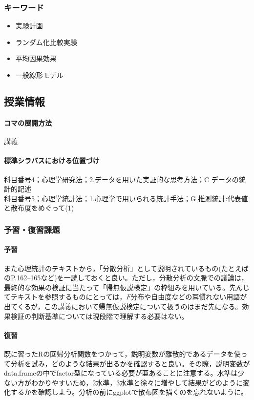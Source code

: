 \subsubsection{キーワード}
\begin{itemize}
	\item 実験計画
	\item ランダム化比較実験
	\item 平均因果効果
	\item 一般線形モデル
\end{itemize}
\subsection{授業情報}
\paragraph{コマの展開方法}
講義
\paragraph{標準シラバスにおける位置づけ}
科目番号4；心理学研究法；2.データを用いた実証的な思考方法；C データの統計的記述\\
科目番号5；心理学統計法；1.心理学で用いられる統計手法；G 推測統計:代表値と散布度をめぐって(1)
\subsubsection{予習・復習課題}
\paragraph{予習}
また心理統計のテキストから，「分散分析」として説明されているもの(たとえば\citet{Yamada2004}のP.162--165など)を一読しておくと良い。ただし，分散分析の文脈での議論は，最終的な効果の検証に当たって「帰無仮説検定」の枠組みを用いている。先んじてテキストを参照するものにとっては，$F分布$や自由度などの耳慣れない用語が出てくるが，この講義において帰無仮説検定について扱うのはまだ先になる。効果検証の判断基準については現段階で理解する必要はない。
\paragraph{復習}
既に習ったRの回帰分析関数をつかって，説明変数が離散的であるデータを使って分析を試み，どのような結果が出るかを確認すると良い。その際，説明変数がdata.frameの中でfactor型になっている必要が亜あることに注意する。水準は少ない方がわかりやすいため，2水準，3水準と徐々に増やして結果がどのように変化するかを確認しよう。分析の前にggplotで散布図を描くのを忘れないように。
